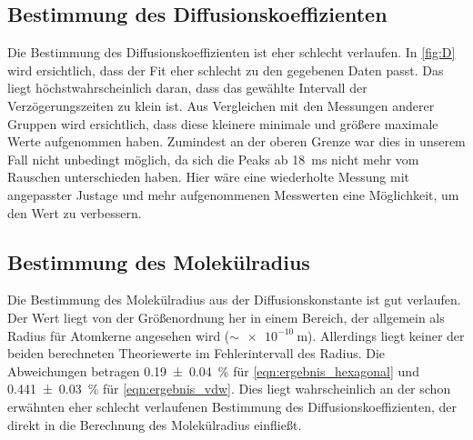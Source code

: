 \subsection{Bestimmung des Diffusionskoeffizienten}
Die Bestimmung des Diffusionskoeffizienten ist eher schlecht verlaufen. In
\autoref{fig:D} wird ersichtlich, dass der Fit eher schlecht zu den gegebenen
Daten passt. Das liegt höchstwahrscheinlich daran, dass das gewählte Intervall
der Verzögerungszeiten zu klein ist. Aus Vergleichen mit den Messungen anderer
Gruppen wird ersichtlich, dass diese kleinere minimale und größere maximale
Werte aufgenommen haben. Zumindest an der oberen Grenze war dies in unserem Fall
nicht unbedingt möglich, da sich die Peaks ab \SI{18}{\ms} nicht mehr vom
Rauschen unterschieden haben. Hier wäre eine wiederholte Messung mit angepasster
Justage und mehr aufgenommenen Messwerten eine Möglichkeit, um den Wert zu
verbessern.

\subsection{Bestimmung des Molekülradius}
Die Bestimmung des Molekülradius aus der Diffusionskonstante ist gut verlaufen.
Der Wert liegt von der Größenordnung her in einem Bereich, der allgemein als
Radius für Atomkerne angesehen wird ($\sim \SI{e-10}{\m}$). Allerdings liegt
keiner der beiden berechneten Theoriewerte im Fehlerintervall des Radius. Die
Abweichungen betragen \SI{0.19(4)}{\percent} für \eqref{eqn:ergebnis_hexagonal}
und \SI{0.441(30)}{\percent} für \eqref{eqn:ergebnis_vdw}. Dies liegt
wahrscheinlich an der schon erwähnten eher schlecht verlaufenen Bestimmung des
Diffusionskoeffizienten, der direkt in die Berechnung des Molekülradius
einfließt.
